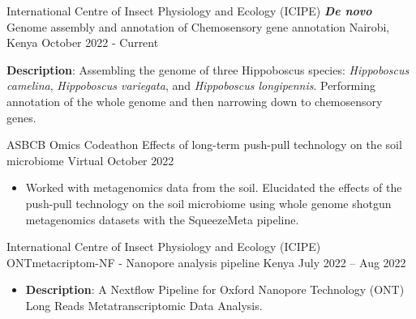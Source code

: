 
\begin{cventries}
  \cventry
    {International Centre of Insect Physiology and Ecology (ICIPE)} %
    {\textit{\textbf{De novo}} Genome assembly and annotation of Chemosensory gene annotation} %
    {Nairobi, Kenya} %
    {October 2022 - Current} %
    {
      \begin{cvitems} %
        \item \textbf{Description}: Assembling the genome of three Hippoboscus species: \textit{Hippoboscus camelina}, \textit{Hippoboscus variegata}, and \textit{Hippoboscus longipennis}. Performing annotation of the whole genome and then narrowing down to chemosensory genes.
      \end{cvitems}
    }
  \cventry
    {ASBCB Omics Codeathon} %
    {Effects of long-term push-pull technology on the soil microbiome} %
    {Virtual} %
    {October 2022} %
    {
      \begin{itemize} %
        \item Worked with metagenomics data from the soil. Elucidated the effects of the push-pull technology on the soil microbiome using whole genome shotgun metagenomics datasets with the SqueezeMeta pipeline.
      \end{itemize}
    }

  \cventry
    {International Centre of Insect Physiology and Ecology (ICIPE)} %
    {ONTmetacriptom-NF - Nanopore analysis pipeline} %
    {Kenya} %
    {July 2022 -- Aug 2022} %
    {
      \begin{itemize} %
        \item \textbf{Description}: A Nextflow Pipeline for Oxford Nanopore Technology (ONT) Long Reads Metatranscriptomic Data Analysis.
      \end{itemize}
    }


\end{cventries}
